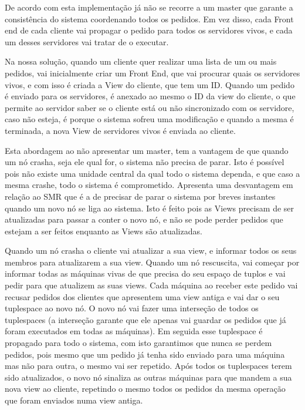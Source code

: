 \documentclass[times, 10pt,twocolumn]{article}
\begin{document}

De acordo com esta implementação já não se recorre a um master que garante a 
consistência do sistema coordenando todos os pedidos. Em vez disso,
cada Front end de cada cliente vai propagar o pedido para todos os servidores vivos,
e cada um desses servidores vai tratar de o executar.


Na nossa solução, quando um cliente quer realizar uma lista de um ou mais pedidos,
vai inicialmente criar um Front End, que vai procurar quais os servidores vivos,
e com isso é criada a View do cliente, que tem um ID. 
Quando um pedido é enviado para os servidores, é anexado ao mesmo o ID da view do cliente,
o que permite ao servidor saber se o cliente está ou não sincronizado com os servidore,
caso não esteja, é porque o sistema sofreu uma modificação e quando a mesma é terminada,
a nova View de servidores vivos é enviada ao cliente.

 

Esta abordagem ao não apresentar um master, tem a vantagem de que quando um nó crasha,
seja ele qual for, o sistema não precisa de parar. Isto é possível pois não existe uma
unidade central da qual todo o sistema dependa, e que caso a mesma crashe, todo o sistema 
é comprometido.
Apresenta uma desvantagem em relação ao SMR que é a de precisar de parar o sistema por 
breves instantes quando um novo nó se liga ao sistema. Isto é feito pois as Views precisam
de ser atualizadas para passar a conter o novo nó, e não se pode perder pedidos que
estejam a ser feitos enquanto as Views são atualizadas.

Quando um nó crasha o cliente vai atualizar a sua view, e informar todos os seus membros
para atualizarem a sua view.
Quando um nó rescuscita, vai começar por informar todas as máquinas vivas de que precisa
do seu espaço de tuplos e vai pedir para que atualizem as suas views. Cada máquina ao
receber este pedido vai recusar pedidos dos clientes que apresentem uma view antiga
e vai dar o seu tuplespace ao novo nó. 
O novo nó vai fazer uma interseção de todos os tuplespaces (a interseção garante
que ele apenas vai guardar os pedidos que já foram executados em todas as máquinas).
Em seguida esse tuplespace é propagado para todo o sistema, com isto garantimos que 
nunca se perdem pedidos, pois mesmo que um pedido já tenha sido enviado para uma máquina
mas não para outra, o mesmo vai ser repetido. Após todos os tuplespaces terem sido
atualizados, o novo nó sinaliza as outras máquinas para que mandem a sua nova view ao cliente,
repetindo o mesmo todos os pedidos da mesma operação que foram enviados numa view antiga.
\end{document}
